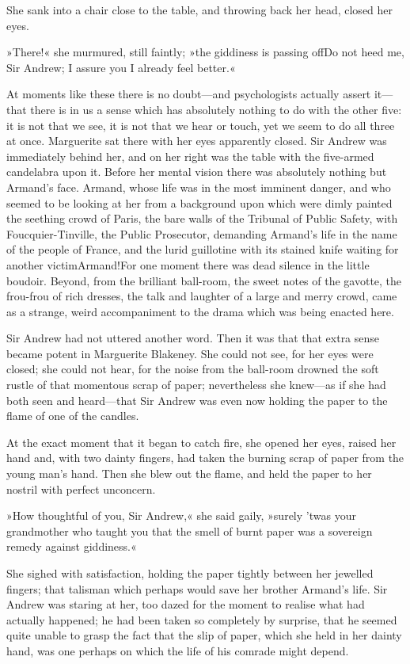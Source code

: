She sank into a chair close to the table, and throwing back her head, closed her eyes.

»There!« she murmured, still faintly; »the giddiness is passing off\textellipsis \allowbreak  Do not heed me, Sir Andrew; I assure you I already feel better.«

At moments like these there is no doubt—and psychologists actually assert it—that there is in us a sense which has absolutely nothing to do with the other five: it is not that we see, it is not that we hear or touch, yet we seem to do all three at once. Marguerite sat there with her eyes apparently closed. Sir Andrew was immediately behind her, and on her right was the table with the five-armed candelabra upon it. Before her mental vision there was absolutely nothing but Armand's face. Armand, whose life was in the most imminent danger, and who seemed to be looking at her from a background upon which were dimly painted the seething crowd of Paris, the bare walls of the Tribunal of Public Safety, with Foucquier-Tinville, the Public Prosecutor, demanding Armand's life in the name of the people of France, and the lurid guillotine with its stained knife waiting for another victim\textellipsis \allowbreak  Armand!\textellipsis \allowbreak  For one moment there was dead silence in the little boudoir. Beyond, from the brilliant ball-room, the sweet notes of the gavotte, the frou-frou of rich dresses, the talk and laughter of a large and merry crowd, came as a strange, weird accompaniment to the drama which was being enacted here.

Sir Andrew had not uttered another word. Then it was that that extra sense became potent in Marguerite Blakeney. She could not see, for her eyes were closed; she could not hear, for the noise from the ball-room drowned the soft rustle of that momentous scrap of paper; nevertheless she knew—as if she had both seen and heard—that Sir Andrew was even now holding the paper to the flame of one of the candles.

At the exact moment that it began to catch fire, she opened her eyes, raised her hand and, with two dainty fingers, had taken the burning scrap of paper from the young man's hand. Then she blew out the flame, and held the paper to her nostril with perfect unconcern.

»How thoughtful of you, Sir Andrew,« she said gaily, »surely 'twas your grandmother who taught you that the smell of burnt paper was a sovereign remedy against giddiness.«

She sighed with satisfaction, holding the paper tightly between her jewelled fingers; that talisman which perhaps would save her brother Armand's life. Sir Andrew was staring at her, too dazed for the moment to realise what had actually happened; he had been taken so completely by surprise, that he seemed quite unable to grasp the fact that the slip of paper, which she held in her dainty hand, was one perhaps on which the life of his comrade might depend.

